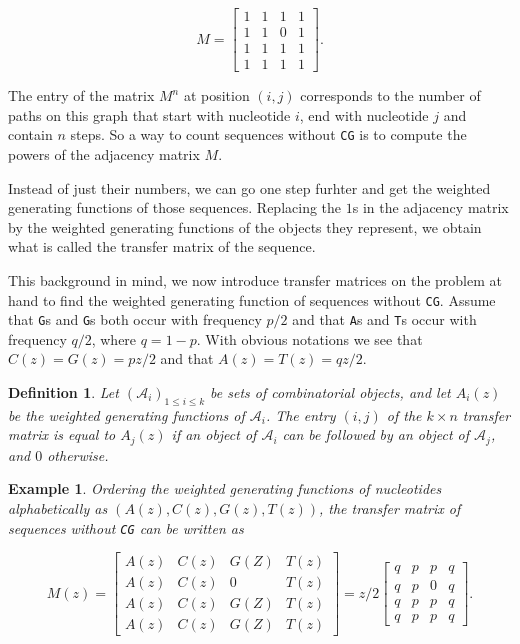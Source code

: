 \documentclass{article}
\newtheorem{definition}{Definition}
\newtheorem{example}{Example}
\begin{document}
\begin{equation*}
M = \left[
\begin{matrix}
1 & 1 & 1 & 1 \\
1 & 1 & 0 & 1 \\
1 & 1 & 1 & 1 \\
1 & 1 & 1 & 1
\end{matrix}
\right].
\end{equation*}

The entry of the matrix $M^n$ at position $(i,j)$ corresponds to the
number of paths on this graph that start with nucleotide $i$, end with
nucleotide $j$ and contain $n$ steps. So a way to count sequences without
\texttt{CG} is to compute the powers of the adjacency matrix $M$.

Instead of just their numbers, we can go one step furhter and get the
weighted generating functions of those sequences. Replacing the $1$s in the
adjacency matrix by the weighted generating functions of the objects they
represent, we obtain what is called the transfer matrix of the sequence.

This background in mind, we now introduce transfer matrices on the problem
at hand to find the weighted generating function of sequences without
\texttt{CG}.  Assume that \texttt{G}s and \texttt{G}s both occur with
frequency $p/2$ and that \texttt{A}s and \texttt{T}s occur with frequency
$q/2$, where $q = 1-p$. With obvious notations we see that $C(z) = G(z) =
pz/2$ and that $A(z) = T(z) = qz/2$.

\begin{definition}
\label{def:transfermat}
Let $(\mathcal{A}_i)_{1 \leq i \leq k}$ be sets of combinatorial objects,
and let $A_i(z)$ be the weighted generating functions of $\mathcal{A}_i$.
The entry $(i,j)$ of the $k\times n$ transfer matrix is equal to $A_j(z)$
if an object of $\mathcal{A}_i$ can be followed by an object of
$\mathcal{A}_j$, and $0$ otherwise.
\end{definition}

\begin{example}
\label{ex:CGmat}
Ordering the weighted generating functions of nucleotides alphabetically
as $(A(z), C(z), G(z), T(z))$, the transfer matrix of sequences without
\texttt{CG} can be written as

\begin{equation}
\label{eq:Mz_CG}
M(z) = \left[
\begin{matrix}
A(z) & C(z) & G(Z) & T(z) \\
A(z) & C(z) &  0   & T(z) \\
A(z) & C(z) & G(Z) & T(z) \\
A(z) & C(z) & G(Z) & T(z)
\end{matrix}
\right] = z/2 \left[
\begin{matrix}
q & p & p & q \\
q & p & 0 & q \\
q & p & p & q \\
q & p & p & q
\end{matrix}
\right].
\end{equation}
\end{example}
\end{document}
